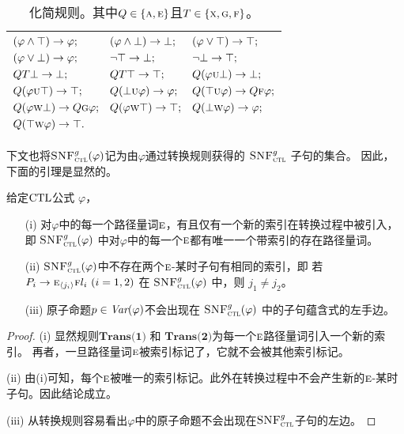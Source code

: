 \begin{table}[h!]%
	\centering\caption{化简规则。其中$Q\in \{\textsc{a}, \textsc{e}\}$且$T\in \{\textsc{x},\textsc{g},\textsc{f}\}$。}\label{tab:simp}
	\begin{tabular}{c}
		\toprule
		$
		\begin{aligned}
						& (\varphi \wedge \top) \rightarrow \varphi;
						&&	(\varphi \wedge \bot) \rightarrow \bot;
						&&  (\varphi \vee \top) \rightarrow \top;\\
						& (\varphi \vee \bot) \rightarrow \varphi; 
						&&  \neg \top \rightarrow \bot; 
						&& \neg \bot \rightarrow \top; \\
						&  QT \bot \rightarrow \bot; 
						&& QT \top \rightarrow \top;  
						&& Q(\varphi \textsc{u} \bot) \rightarrow \bot;\\
						& Q(\varphi \textsc{u} \top) \rightarrow \top;
						&& Q(\bot \textsc{u} \varphi) \rightarrow \varphi;
						&& Q(\top \textsc{u} \varphi) \rightarrow Q\textsc{f} \varphi;\\
						& Q(\varphi \textsc{w} \bot) \rightarrow Q\textsc{g} \varphi;
						&& Q(\varphi \textsc{w} \top) \rightarrow \top; 
						&& Q(\bot \textsc{w} \varphi) \rightarrow \varphi;\\
						& Q(\top \textsc{w} \varphi) \rightarrow \top.
		\end{aligned}
		$\\
		\bottomrule
	\end{tabular}
\end{table}

下文也将${\textsc{SNF}_{\textsc{ctl}}^g}(\varphi)$记为由$\varphi$通过转换规则获得的 ${\textsc{SNF}_{\textsc{ctl}}^g}$ 子句的集合。
因此，下面的引理是显然的。


\begin{lemma} \label{lem:ResTransPt}
	给定$\textrm{CTL}$公式 $\varphi$，
	\begin{itemize}
		\item[(i)] 对$\varphi$中的每一个路径量词$\textsc{e}$，有且仅有一个新的索引在转换过程中被引入，即 ${\textsc{SNF}_{\textsc{ctl}}^g}(\varphi)$ 中对$\varphi$中的每一个$\textsc{e}$都有唯一一个带索引的存在路径量词。
		\item[(ii)] ${\textsc{SNF}_{\textsc{ctl}}^g}(\varphi)$中不存在两个$\textsc{e}$-某时子句有相同的索引，即
		若 $P_i\rightarrow \textsc{e}_{{\langle{j_i}\rangle}}\textsc{f} l_i~(i=1,2)$ 在 ${\textsc{SNF}_{\textsc{ctl}}^g}(\varphi)$ 中，则
		$j_1\neq j_2$。
		\item[(iii)] 原子命题$p \in\textit{Var}(\varphi)$不会出现在 ${\textsc{SNF}_{\textsc{ctl}}^g}(\varphi)$ 中的子句蕴含式的左手边。
	\end{itemize}
\end{lemma}
\begin{proof}
	(i) 显然规则$\textbf{Trans(1)}$ 和 $\textbf{Trans(2)}$为每一个$\textsc{e}$路径量词引入一个新的索引。 
	再者，一旦路径量词$\textsc{e}$被索引标记了，它就不会被其他索引标记。
	
	(ii) 由(i)可知，每个$\textsc{e}$被唯一的索引标记。此外在转换过程中不会产生新的$\textsc{e}$-某时子句。因此结论成立。
	
	(iii) 从转换规则容易看出$\varphi$中的原子命题不会出现在${\textsc{SNF}_{\textsc{ctl}}^g}$子句的左边。
\end{proof}

